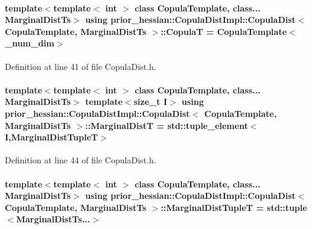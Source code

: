 \paragraph[{\texorpdfstring{CopulaT}{CopulaT}}]{\setlength{\rightskip}{0pt plus 5cm}template$<$template$<$ int $>$ class Copula\+Template, class... Marginal\+Dist\+Ts$>$ using {\bf prior\+\_\+hessian\+::\+Copula\+Dist\+Impl\+::\+Copula\+Dist}$<$ Copula\+Template, Marginal\+Dist\+Ts $>$\+::{\bf CopulaT} =  Copula\+Template$<$\+\_\+num\+\_\+dim$>$}\hypertarget{classprior__hessian_1_1CopulaDistImpl_1_1CopulaDist_a5525f8d14c3a1b3caf2f09d0e86a650f}{}\label{classprior__hessian_1_1CopulaDistImpl_1_1CopulaDist_a5525f8d14c3a1b3caf2f09d0e86a650f}


Definition at line 41 of file Copula\+Dist.\+h.

\paragraph[{\texorpdfstring{Marginal\+DistT}{MarginalDistT}}]{\setlength{\rightskip}{0pt plus 5cm}template$<$template$<$ int $>$ class Copula\+Template, class... Marginal\+Dist\+Ts$>$ template$<$size\+\_\+t I$>$ using {\bf prior\+\_\+hessian\+::\+Copula\+Dist\+Impl\+::\+Copula\+Dist}$<$ Copula\+Template, Marginal\+Dist\+Ts $>$\+::{\bf Marginal\+DistT} =  std\+::tuple\+\_\+element$<$I,{\bf Marginal\+Dist\+TupleT}$>$}\hypertarget{classprior__hessian_1_1CopulaDistImpl_1_1CopulaDist_aa2817fd47846a28d6b751940ab1b0376}{}\label{classprior__hessian_1_1CopulaDistImpl_1_1CopulaDist_aa2817fd47846a28d6b751940ab1b0376}


Definition at line 44 of file Copula\+Dist.\+h.

\paragraph[{\texorpdfstring{Marginal\+Dist\+TupleT}{MarginalDistTupleT}}]{\setlength{\rightskip}{0pt plus 5cm}template$<$template$<$ int $>$ class Copula\+Template, class... Marginal\+Dist\+Ts$>$ using {\bf prior\+\_\+hessian\+::\+Copula\+Dist\+Impl\+::\+Copula\+Dist}$<$ Copula\+Template, Marginal\+Dist\+Ts $>$\+::{\bf Marginal\+Dist\+TupleT} =  std\+::tuple$<$Marginal\+Dist\+Ts...$>$}\hypertarget{classprior__hessian_1_1CopulaDistImpl_1_1CopulaDist_acf46fae43d481ed82a2147433e5f2ff6}{}\label{classprior__hessian_1_1CopulaDistImpl_1_1CopulaDist_acf46fae43d481ed82a2147433e5f2ff6}



